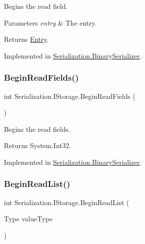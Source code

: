Begins the read field. 


\begin{DoxyParams}{Parameters}
{\em entry} & The entry.\\
\hline
\end{DoxyParams}
\begin{DoxyReturn}{Returns}
\hyperlink{class_serialization_1_1_entry}{Entry}.
\end{DoxyReturn}


Implemented in \hyperlink{class_serialization_1_1_binary_serializer_ab6dd090acf50ee9f39d461fa7e7c61d6}{Serialization.\+Binary\+Serializer}.

\mbox{\label{interface_serialization_1_1_i_storage_af7e9c21d8e723c2b7482d0ce7db7e3c5}} 
\subsubsection{\texorpdfstring{Begin\+Read\+Fields()}{BeginReadFields()}}
{\footnotesize\ttfamily int Serialization.\+I\+Storage.\+Begin\+Read\+Fields (\begin{DoxyParamCaption}{ }\end{DoxyParamCaption})}



Begins the read fields. 

\begin{DoxyReturn}{Returns}
System.\+Int32.
\end{DoxyReturn}


Implemented in \hyperlink{class_serialization_1_1_binary_serializer_aa92efbd2f56eeb65e80890ed4bf3bdbe}{Serialization.\+Binary\+Serializer}.

\mbox{\label{interface_serialization_1_1_i_storage_afe6be681d819bbfd7db4078f29230020}} 
\subsubsection{\texorpdfstring{Begin\+Read\+List()}{BeginReadList()}}
{\footnotesize\ttfamily int Serialization.\+I\+Storage.\+Begin\+Read\+List (\begin{DoxyParamCaption}\item[{Type}]{value\+Type }\end{DoxyParamCaption})}



